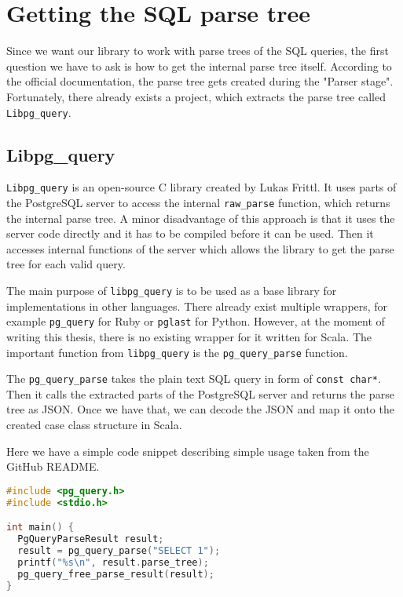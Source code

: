 
\section{Getting the SQL parse tree}
Since we want our library to work with parse trees of the SQL queries, the first question we have to ask is how to get the internal parse tree itself. According to the official documentation\cite{PostgreSQL documentation}, the parse tree gets created during the "Parser stage". Fortunately, there already exists a project, which extracts the parse tree called \texttt{Libpg\_query}.

\subsection{Libpg\_query}
\texttt{Libpg\_query} is an open-source C library created by Lukas Frittl. It uses parts of the PostgreSQL server to access the internal \texttt{raw\_parse} function, which returns the internal parse tree. A minor disadvantage of this approach is that it uses the server code directly and it has to be compiled before it can be used. Then it accesses internal functions of the server which allows the library to get the parse tree for each valid query.

The main purpose of \texttt{libpg\_query} is to be used as a base library for implementations in other languages. There already exist multiple wrappers, for example \texttt{pg\_query} for Ruby or \texttt{pglast} for Python. However, at the moment of writing this thesis, there is no existing wrapper for it written for Scala. The important function from \texttt{libpg\_query} is the \texttt{pg\_query\_parse} function.

The \texttt{pg\_query\_parse} takes the plain text SQL query in form of \texttt{const char*}. Then it calls the extracted parts of the PostgreSQL server and returns the parse tree as JSON. Once we have that, we can decode the JSON and map it onto the created case class structure in Scala.

\newpage
Here we have a simple code snippet describing simple usage taken from the GitHub README\cite{libpgquery}. 

\begin{lstlisting}[language=C, basicstyle=\ttfamily, keywordstyle=\color{purple}]
#include <pg_query.h>
#include <stdio.h>

int main() {
  PgQueryParseResult result;
  result = pg_query_parse("SELECT 1");
  printf("%s\n", result.parse_tree);
  pg_query_free_parse_result(result);
}
\end{lstlisting}

